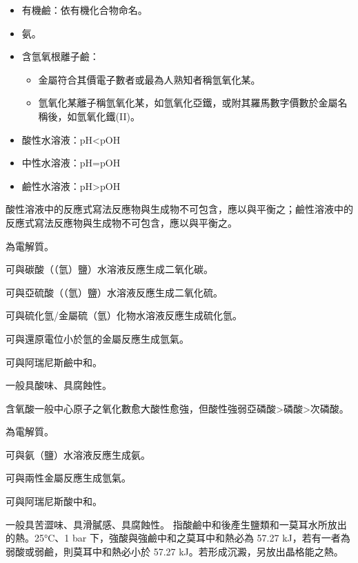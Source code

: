 \documentclass[a4paper,12pt]{article}
\begin{document}
\begin{itemize}
\item 有機鹼：依有機化合物命名。
\item 氨。
\item 含氫氧根離子鹼：
\begin{itemize}
\item 金屬符合其價電子數者或最為人熟知者稱氫氧化某。
\item 氫氧化某離子稱氫氧化某，如氫氧化亞鐵，或附其羅馬數字價數於金屬名稱後，如氫氧化鐵(II)。
\end{itemize}
\end{itemize}
\begin{itemize}
\item 酸性水溶液：pH<pOH
\item 中性水溶液：pH=pOH
\item 鹼性水溶液：pH>pOH
\end{itemize}
酸性溶液中的反應式寫法反應物與生成物不可包含，應以與平衡之；鹼性溶液中的反應式寫法反應物與生成物不可包含，應以與平衡之。
\bit
\item 為電解質。
\item 可與碳酸（（氫）鹽）水溶液反應生成二氧化碳。
\item 可與亞硫酸（（氫）鹽）水溶液反應生成二氧化硫。
\item 可與硫化氫/金屬硫（氫）化物水溶液反應生成硫化氫。
\item 可與還原電位小於氫的金屬反應生成氫氣。
\item 可與阿瑞尼斯鹼中和。
\item 一般具酸味、具腐蝕性。
\item 含氧酸一般中心原子之氧化數愈大酸性愈強，但酸性強弱亞磷酸>磷酸>次磷酸。
\eit
{}
\bit
\item 為電解質。
\item 可與氨（鹽）水溶液反應生成氨。
\item 可與兩性金屬反應生成氫氣。
\item 可與阿瑞尼斯酸中和。
\item 一般具苦澀味、具滑膩感、具腐蝕性。
\eit
{}
指酸鹼中和後產生鹽類和一莫耳水所放出的熱。25°C、1 bar 下，強酸與強鹼中和之莫耳中和熱必為 57.27 kJ，若有一者為弱酸或弱鹼，則莫耳中和熱必小於 57.27 kJ。若形成沉澱，另放出晶格能之熱。
\end{document}
